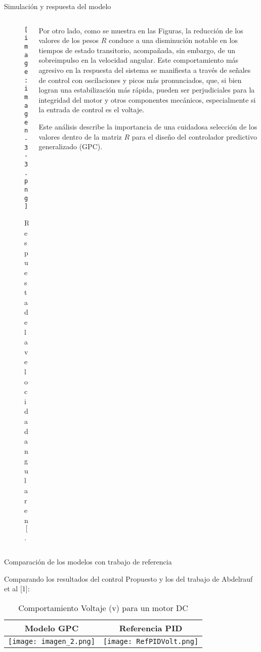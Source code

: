 \documentclass{beamer}
\begin{document}
\begin{frame}{Simulación y respuesta del modelo}
    \begin{columns}
        \begin{column}{0.45\textwidth}
            \begin{figure}
                \centering
                \texttt{[image: imagen-3-3.png]}
                \caption{Respuesta de la velocidad angular en $[rad/seg]$.}
                \label{fig:practico-1}
            \end{figure}
        \end{column}
        
        \begin{column}{0.5\textwidth}
            \scriptsize
            \begin{justify}
                Por otro lado, como se muestra en las Figuras, la reducción de los valores de los pesos \( R \) conduce a una disminución notable en los tiempos de estado transitorio, acompañada, sin embargo, de un sobreimpulso en la velocidad angular. Este comportamiento más agresivo en la respuesta del sistema se manifiesta a través de señales de control con oscilaciones y picos más pronunciados, que, si bien logran una estabilización más rápida, pueden ser perjudiciales para la integridad del motor y otros componentes mecánicos, especialmente si la entrada de control es el voltaje.

                \vspace{0.2cm}
                Este análisis describe la importancia de una cuidadosa selección de los valores dentro de la matriz \( R \) para el diseño del controlador predictivo generalizado (GPC). 
            \end{justify}
        \end{column}
    \end{columns}
\end{frame}




\begin{frame}{Comparación de los modelos con trabajo de referencia}
\begin{justify}
\vspace{0.3cm}

\begin{itemize}  
Comparando los resultados del control Propuesto y los del trabajo de Abdelrauf et al [1]:      
\begin{table}[ht]
  \centering
  \begin{tabular}{|c|c|}
    \hline
    Modelo GPC & Referencia PID \\
    \hline
    \texttt{[image: imagen\_2.png]} & \texttt{[image: RefPIDVolt.png]} \\
    \hline
  \end{tabular}
  \caption{Comportamiento Voltaje (v) para un motor DC}
  \label{tab:tabla_con_imagenes}
\end{table}

\end{itemize}
\end{justify}
\end{frame}
\end{document}
